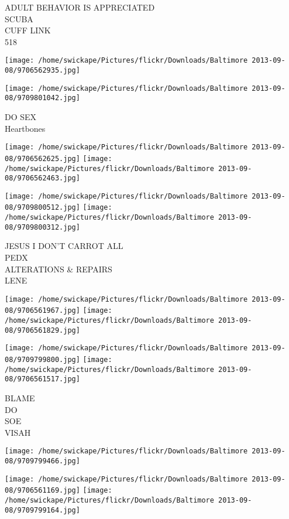 \documentclass[10pt,letterpaper]{article}
\begin{document}
ADULT BEHAVIOR IS APPRECIATED\\
SCUBA\\
CUFF LINK\\
518
\pagebreak

\texttt{[image: /home/swickape/Pictures/flickr/Downloads/Baltimore 2013-09-08/9706562935.jpg]}

\vspace{0.25in}
\texttt{[image: /home/swickape/Pictures/flickr/Downloads/Baltimore 2013-09-08/9709801042.jpg]}

DO SEX\\
Heartbones
\pagebreak

\texttt{[image: /home/swickape/Pictures/flickr/Downloads/Baltimore 2013-09-08/9706562625.jpg]}
\texttt{[image: /home/swickape/Pictures/flickr/Downloads/Baltimore 2013-09-08/9706562463.jpg]}

\texttt{[image: /home/swickape/Pictures/flickr/Downloads/Baltimore 2013-09-08/9709800512.jpg]}
\texttt{[image: /home/swickape/Pictures/flickr/Downloads/Baltimore 2013-09-08/9709800312.jpg]}

JESUS I DON'T CARROT ALL\\
PEDX\\
ALTERATIONS \& REPAIRS\\
LENE
\pagebreak

\texttt{[image: /home/swickape/Pictures/flickr/Downloads/Baltimore 2013-09-08/9706561967.jpg]}
\texttt{[image: /home/swickape/Pictures/flickr/Downloads/Baltimore 2013-09-08/9706561829.jpg]}

\texttt{[image: /home/swickape/Pictures/flickr/Downloads/Baltimore 2013-09-08/9709799800.jpg]}
\texttt{[image: /home/swickape/Pictures/flickr/Downloads/Baltimore 2013-09-08/9706561517.jpg]}

BLAME\\
DO\\
SOE\\
VISAH
\pagebreak

\texttt{[image: /home/swickape/Pictures/flickr/Downloads/Baltimore 2013-09-08/9709799466.jpg]}

\vspace{0.25in}
\texttt{[image: /home/swickape/Pictures/flickr/Downloads/Baltimore 2013-09-08/9706561169.jpg]}
\texttt{[image: /home/swickape/Pictures/flickr/Downloads/Baltimore 2013-09-08/9709799164.jpg]}
\end{document}
